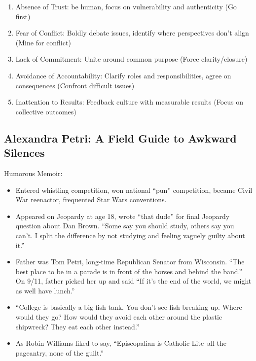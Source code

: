 \documentclass[
]{article}
\begin{document}
\begin{enumerate}
\def\labelenumi{\arabic{enumi}.}
\item
  Absence of Trust: be human, focus on vulnerability and authenticity
  (Go first)
\item
  Fear of Conflict: Boldly debate issues, identify where perspectives
  don't align (Mine for conflict)
\item
  Lack of Commitment: Unite around common purpose (Force
  clarity/closure)
\item
  Avoidance of Accountability: Clarify roles and responsibilities, agree
  on consequences (Confront difficult issues)
\item
  Inattention to Results: Feedback culture with measurable results
  (Focus on collective outcomes)
\end{enumerate}

\hypertarget{alexandra-petri-a-field-guide-to-awkward-silences}{%
\subsection{Alexandra Petri: A Field Guide to Awkward
Silences}\label{alexandra-petri-a-field-guide-to-awkward-silences}}

Humorous Memoir:

\begin{itemize}
\item
  Entered whistling competition, won national ``pun'' competition,
  became Civil War reenactor, frequented Star Wars conventions.
\item
  Appeared on Jeopardy at age 18, wrote ``that dude'' for final Jeopardy
  question about Dan Brown. ``Some say you should study, others say you
  can't. I split the difference by not studying and feeling vaguely
  guilty about it.''
\item
  Father was Tom Petri, long-time Republican Senator from Wisconsin.
  ``The best place to be in a parade is in front of the horses and
  behind the band.'' On 9/11, father picked her up and said ``If it's
  the end of the world, we might as well have lunch.''
\item
  ``College is basically a big fish tank. You don't see fish breaking
  up. Where would they go? How would they avoid each other around the
  plastic shipwreck? They eat each other instead.''
\item
  As Robin Williams liked to say, ``Episcopalian is Catholic Lite--all
  the pageantry, none of the guilt.''
\end{itemize}
\end{document}
